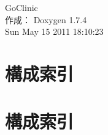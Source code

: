 \documentclass[a4paper]{book}
\begin{document}
\hypersetup{pageanchor=false}
\begin{titlepage}
\vspace*{7cm}
\begin{center}
{\Large GoClinic }\\
\vspace*{1cm}
{\large 作成： Doxygen 1.7.4}\\
\vspace*{0.5cm}
{\small Sun May 15 2011 18:10:23}\\
\end{center}
\end{titlepage}
\clearemptydoublepage
{}
\tableofcontents
\clearemptydoublepage
{}
\hypersetup{pageanchor=true}
\chapter{構成索引}

\chapter{構成索引}

\end{document}
